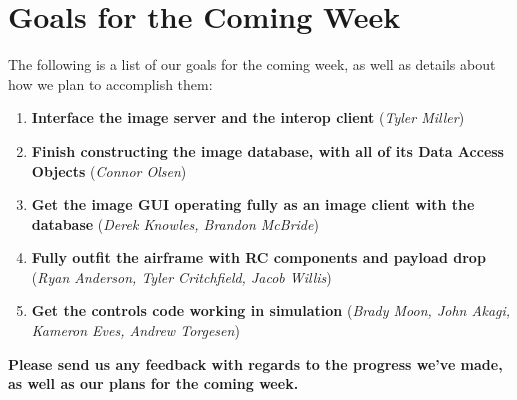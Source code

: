 \documentclass[]{../auvsi_doc}
\begin{document}
\section{Goals for the Coming Week}

The following is a list of our goals for the coming week, as well as details about how we plan to accomplish them:

\begin{enumerate}
\item \textbf{Interface the image server and the interop client} (\textit{Tyler Miller})
\item \textbf{Finish constructing the image database, with all of its Data Access Objects} (\textit{Connor Olsen})
\item \textbf{Get the image GUI operating fully as an image client with the database} (\textit{Derek Knowles, Brandon McBride})
\item \textbf{Fully outfit the airframe with RC components and payload drop} (\textit{Ryan Anderson, Tyler Critchfield, Jacob Willis})
\item \textbf{Get the controls code working in simulation} (\textit{Brady Moon, John Akagi, Kameron Eves, Andrew Torgesen})
\end{enumerate}

\textbf{Please send us any feedback with regards to the progress we've made, as well as our plans for the coming week.}

%
%
%
\end{document}
